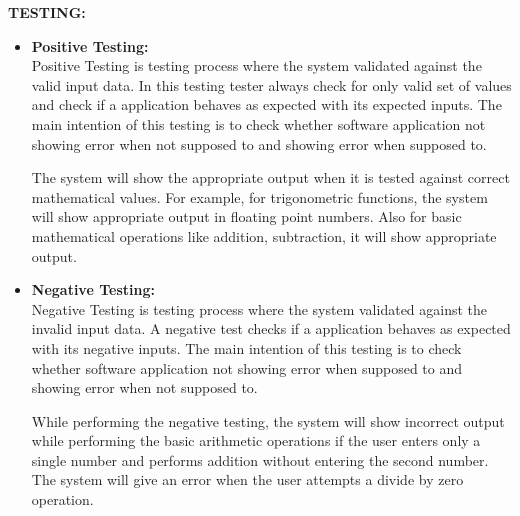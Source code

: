 \documentclass[a4paper,12pt]{article}
\begin{document}
\noindent \textbf{TESTING:}
\begin{itemize}
\item \textbf{Positive Testing:}\\
Positive Testing is testing process where the system validated against the valid input data. In this testing tester always check for only valid set of values and check if a application behaves as expected with its expected inputs. The main intention of this testing is to check whether software application not showing error when not supposed to and showing error when supposed to.

The system will show the appropriate output when it is tested against correct mathematical values. For example, for trigonometric functions, the system will show appropriate output in floating point numbers. Also for basic mathematical operations like addition, subtraction, it will show appropriate output.

\item \textbf{Negative Testing:}\\
Negative Testing is testing process where the system validated against the invalid input data. A negative test checks if a application behaves as expected with its negative inputs. The main intention of this testing is to check whether software application not showing error when supposed to and showing error when not supposed to.

While performing the negative testing, the system will show incorrect output while performing the basic arithmetic operations if the user enters only a single number and performs addition without entering the second number. The system will give an error when the user attempts a divide by zero operation.
\end{itemize}
\end{document}
